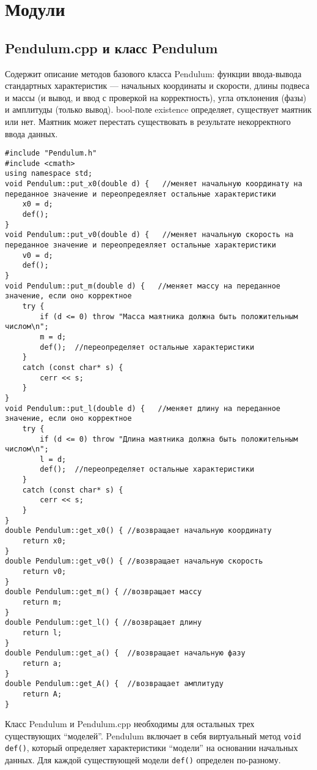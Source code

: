 \documentclass {report}
\begin{document}
\section{Модули} 
\subsection{Pendulum.cpp и класс Pendulum}
Содержит описание методов базового класса Pendulum: функции ввода-вывода стандартных характеристик --- начальных координаты и скорости, длины подвеса и массы (и вывод, и ввод с проверкой на корректность), угла отклонения (фазы) и амплитуды (только вывод). bool-поле existence определяет, существует маятник или нет. Маятник может перестать существовать в результате некорректного ввода данных. 
\begin{lstlisting}[caption=Pendulum.cpp]
#include "Pendulum.h"
#include <cmath>
using namespace std;
void Pendulum::put_x0(double d) { 	//меняет начальную координату на переданное значение и переопредеяляет остальные характеристики
	x0 = d;
	def();
}
void Pendulum::put_v0(double d) { 	//меняет начальную скорость на переданное значение и переопредеяляет остальные характеристики 
	v0 = d;
	def();
}
void Pendulum::put_m(double d) {   //меняет массу на переданное значение, если оно корректное
	try {
		if (d <= 0) throw "Масса маятника должна быть положительным числом\n";
		m = d;
		def();	//переопределяет остальные характеристики
	}
	catch (const char* s) {
		cerr << s;
	}
}
void Pendulum::put_l(double d) {   //меняет длину на переданное значение, если оно корректное
	try {
		if (d <= 0) throw "Длина маятника должна быть положительным числом\n";
		l = d;
		def();	//переопределяет остальные характеристики
	}
	catch (const char* s) {
		cerr << s;
	}
}
double Pendulum::get_x0() { //возвращает начальную координату
	return x0;
}
double Pendulum::get_v0() { //возвращает начальную скорость
	return v0;
}
double Pendulum::get_m() { //возвращает массу
	return m;
}
double Pendulum::get_l() { //возвращает длину
	return l;
}
double Pendulum::get_a() {  //возвращает начальную фазу
	return a;
}
double Pendulum::get_A() {  //возвращает амплитуду
	return A;
}
\end{lstlisting}
Класс Pendulum и Pendulum.cpp необходимы для остальных трех существующих ``моделей''. Pendulum включает в себя виртуальный метод \texttt{void def()}, который определяет характеристики ``модели'' на основании начальных данных. Для каждой существующей модели \texttt{def()} определен по-разному.
\end{document}
